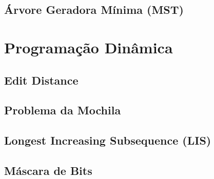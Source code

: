 \subsection{Árvore Geradora Mínima (MST)}


% 

% 

% 

% 

\section{Programação Dinâmica}

\subsection{Edit Distance}


\subsection{Problema da Mochila}


\subsection{Longest Increasing Subsequence (LIS)}


\subsection{Máscara de Bits}


